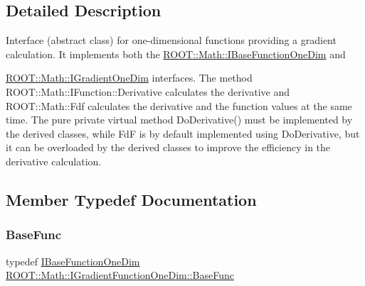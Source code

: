 \subsection{Detailed Description}
Interface (abstract class) for one-\/dimensional functions providing a gradient calculation. It implements both the \mbox{\hyperlink{classROOT_1_1Math_1_1IBaseFunctionOneDim}{R\+O\+O\+T\+::\+Math\+::\+I\+Base\+Function\+One\+Dim}} and

\mbox{\hyperlink{classROOT_1_1Math_1_1IGradientOneDim}{R\+O\+O\+T\+::\+Math\+::\+I\+Gradient\+One\+Dim}} interfaces. The method R\+O\+O\+T\+::\+Math\+::\+I\+Function\+::\+Derivative calculates the derivative and R\+O\+O\+T\+::\+Math\+::\+Fdf calculates the derivative and the function values at the same time. The pure private virtual method Do\+Derivative() must be implemented by the derived classes, while FdF is by default implemented using Do\+Derivative, but it can be overloaded by the derived classes to improve the efficiency in the derivative calculation. 

\subsection{Member Typedef Documentation}
\mbox{\label{classROOT_1_1Math_1_1IGradientFunctionOneDim_a9eae6bcbeb2d0396937710bd70bd29d0}} 
\subsubsection{\texorpdfstring{BaseFunc}{BaseFunc}\hspace{0.1cm}{\footnotesize\ttfamily [1/3]}}
{\footnotesize\ttfamily typedef \mbox{\hyperlink{classROOT_1_1Math_1_1IBaseFunctionOneDim}{I\+Base\+Function\+One\+Dim}} \mbox{\hyperlink{classROOT_1_1Math_1_1IGradientFunctionOneDim_a9eae6bcbeb2d0396937710bd70bd29d0}{R\+O\+O\+T\+::\+Math\+::\+I\+Gradient\+Function\+One\+Dim\+::\+Base\+Func}}}

\mbox{\label{classROOT_1_1Math_1_1IGradientFunctionOneDim_a9eae6bcbeb2d0396937710bd70bd29d0}} 
